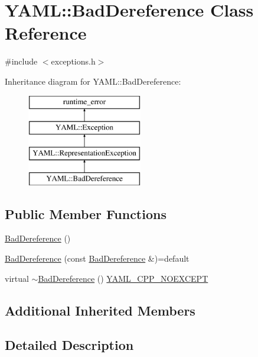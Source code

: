 \hypertarget{class_y_a_m_l_1_1_bad_dereference}{}\section{Y\+A\+ML\+::Bad\+Dereference Class Reference}
\label{class_y_a_m_l_1_1_bad_dereference}


{\ttfamily \#include $<$exceptions.\+h$>$}

Inheritance diagram for Y\+A\+ML\+::Bad\+Dereference\+:\begin{figure}[H]
\begin{center}
\leavevmode
\includegraphics[height=4.000000cm]{class_y_a_m_l_1_1_bad_dereference}
\end{center}
\end{figure}
\subsection*{Public Member Functions}
\begin{DoxyCompactItemize}
\item 
\mbox{\hyperlink{class_y_a_m_l_1_1_bad_dereference_a54e77ac024b68a65af52efe974c1946b}{Bad\+Dereference}} ()
\item 
\mbox{\hyperlink{class_y_a_m_l_1_1_bad_dereference_a11927b3a61e56e4e014ead45cbe2a845}{Bad\+Dereference}} (const \mbox{\hyperlink{class_y_a_m_l_1_1_bad_dereference}{Bad\+Dereference}} \&)=default
\item 
virtual \mbox{\hyperlink{class_y_a_m_l_1_1_bad_dereference_a303a03d7521e7a3dbd649faa33c15c6a}{$\sim$\+Bad\+Dereference}} () \mbox{\hyperlink{exceptions_8cpp_a4ea58eb0a28000364858d4942add7d1a}{Y\+A\+M\+L\+\_\+\+C\+P\+P\+\_\+\+N\+O\+E\+X\+C\+E\+PT}}
\end{DoxyCompactItemize}
\subsection*{Additional Inherited Members}


\subsection{Detailed Description}


